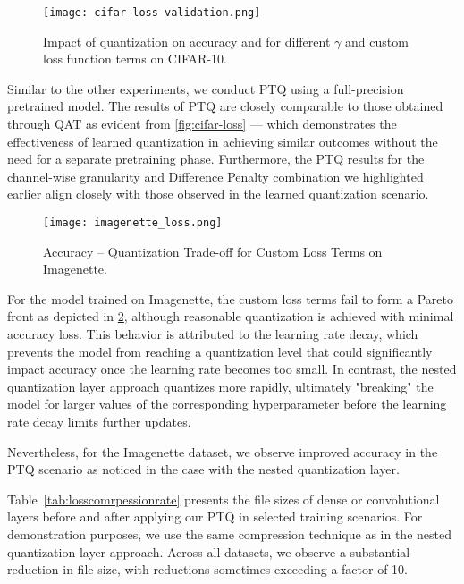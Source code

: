 \begin{figure}[t!]
  \centering
  \texttt{[image: cifar-loss-validation.png]}
  \caption{Impact of quantization on accuracy and for different \( \gamma \) and custom loss function terms on CIFAR-10.}
  \label{fig:cifar-loss-validation}
\end{figure}

Similar to the other experiments, we conduct PTQ using a full-precision pretrained model. 
The results of PTQ are closely comparable to those obtained through QAT as evident from \cref{fig:cifar-loss}
— which demonstrates the effectiveness of learned quantization in achieving similar outcomes 
without the need for a separate pretraining phase.
Furthermore, the PTQ results for the channel-wise granularity and Difference Penalty combination we highlighted earlier
align closely with those observed in the learned quantization scenario.

\begin{figure}[t!]
  \centering
  \texttt{[image: imagenette\_loss.png]}
  \caption{Accuracy – Quantization Trade-off for Custom Loss Terms on Imagenette.}
  \label{fig:imagenette-loss}
\end{figure}

For the model trained on Imagenette, 
the custom loss terms fail to form a Pareto front as depicted in \cref{fig:imagenette-loss}, 
although reasonable quantization is achieved with minimal accuracy loss. 
This behavior is attributed to the learning rate decay, 
which prevents the model from reaching a quantization level that could significantly 
impact accuracy once the learning rate becomes too small. In contrast, 
the nested quantization layer approach quantizes more rapidly, ultimately 
"breaking" the model for larger values of the corresponding 
hyperparameter before the learning rate decay limits further updates.

Nevertheless, for the Imagenette dataset, we observe improved accuracy in the PTQ scenario
as noticed in the case with the nested quantization layer. 

Table~\ref{tab:losscomrpessionrate} presents the file sizes of dense or convolutional layers before and after applying our PTQ in selected training scenarios. 
For demonstration purposes, we use the same compression technique as in the nested quantization layer approach.
Across all datasets, we observe a substantial reduction in file size, with reductions sometimes exceeding a factor of 10. 

